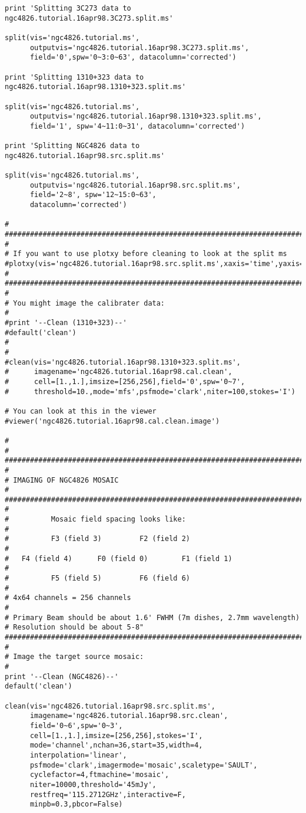 \begin{verbatim}
print 'Splitting 3C273 data to ngc4826.tutorial.16apr98.3C273.split.ms'

split(vis='ngc4826.tutorial.ms',
      outputvis='ngc4826.tutorial.16apr98.3C273.split.ms',
      field='0',spw='0~3:0~63', datacolumn='corrected')

print 'Splitting 1310+323 data to ngc4826.tutorial.16apr98.1310+323.split.ms'

split(vis='ngc4826.tutorial.ms',
      outputvis='ngc4826.tutorial.16apr98.1310+323.split.ms',
      field='1', spw='4~11:0~31', datacolumn='corrected')

print 'Splitting NGC4826 data to ngc4826.tutorial.16apr98.src.split.ms'

split(vis='ngc4826.tutorial.ms',
      outputvis='ngc4826.tutorial.16apr98.src.split.ms',
      field='2~8', spw='12~15:0~63',
      datacolumn='corrected')

#
##########################################################################
#
# If you want to use plotxy before cleaning to look at the split ms
#plotxy(vis='ngc4826.tutorial.16apr98.src.split.ms',xaxis='time',yaxis='amp')
#
##########################################################################
#
# You might image the calibrater data:
#
#print '--Clean (1310+323)--'
#default('clean')
#
#
#clean(vis='ngc4826.tutorial.16apr98.1310+323.split.ms',
#      imagename='ngc4826.tutorial.16apr98.cal.clean',
#      cell=[1.,1.],imsize=[256,256],field='0',spw='0~7',
#      threshold=10.,mode='mfs',psfmode='clark',niter=100,stokes='I')

# You can look at this in the viewer
#viewer('ngc4826.tutorial.16apr98.cal.clean.image')

#
#
##########################################################################
#
# IMAGING OF NGC4826 MOSAIC
#
##########################################################################
#
#          Mosaic field spacing looks like:
#
#          F3 (field 3)         F2 (field 2)
#
#   F4 (field 4)      F0 (field 0)        F1 (field 1)
#
#          F5 (field 5)         F6 (field 6)
#
# 4x64 channels = 256 channels 
#
# Primary Beam should be about 1.6' FWHM (7m dishes, 2.7mm wavelength)
# Resolution should be about 5-8"
##########################################################################
#
# Image the target source mosaic:
#
print '--Clean (NGC4826)--'
default('clean')

clean(vis='ngc4826.tutorial.16apr98.src.split.ms',
      imagename='ngc4826.tutorial.16apr98.src.clean',
      field='0~6',spw='0~3',
      cell=[1.,1.],imsize=[256,256],stokes='I',
      mode='channel',nchan=36,start=35,width=4,
      interpolation='linear',
      psfmode='clark',imagermode='mosaic',scaletype='SAULT',
      cyclefactor=4,ftmachine='mosaic',
      niter=10000,threshold='45mJy',
      restfreq='115.2712GHz',interactive=F,
      minpb=0.3,pbcor=False)



\end{verbatim}
